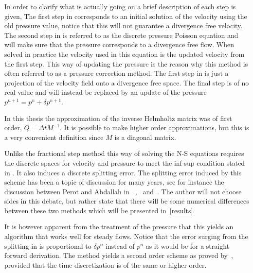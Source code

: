 In order to clarify what is actually going on a brief description of each step is given,
The first step in  corresponds to an initial solution of the velocity using 
the old pressure value, notice that this will not guarantee a divergence free velocity.
The second step in  is referred to as the discrete pressure Poisson equation and will 
make sure that the pressure corresponds to a divergence free flow. When solved in practice 
the velocity used in this equation is the updated velocity from the first step. This way of 
updating the pressure is the reason why this method is often referred to as a pressure 
correction method.
The first step in  is just a projection of the velocity field
onto a divergence free space. The final step is of no real value and will instead be replaced 
by an update of the pressure $p^{n+1} = p^{n}+\delta p^{n+1}$.

In this thesis the approximation of the inverse Helmholtz matrix was of first order, 
$Q = \Delta t M^{-1}$. It is possible to make higher order approximations, but this is 
a very convenient definition since $M$ is a diagonal matrix.

Unlike the fractional step method this way of solving the N-S equations  
requires the discrete spaces for velocity and pressure
to meet the inf-sup condition stated in . 
It also induces a discrete splitting error. The splitting error induced by this scheme 
has been a topic of discussion for many years, see for instance the discussion between Perot and Abdallah in
~\cite{Perot},~\cite{Abdallah} and~\cite{Perotcomments}. The author will not choose sides in this debate, 
but rather state that there will be some numerical differences between these two methods which will be presented 
in~\cref{results}.

It is however apparent from the treatment of the pressure that this yields an algorithm that works well 
for steady flows. Notice that the error surging from the splitting in 
is proportional to $\delta p^n$ instead of $p^n$ as it would be for a straight forward derivation. 
The method yields a second order scheme as proved by~\cite{vanKan},
provided that the time discretization is of the same or higher order.
